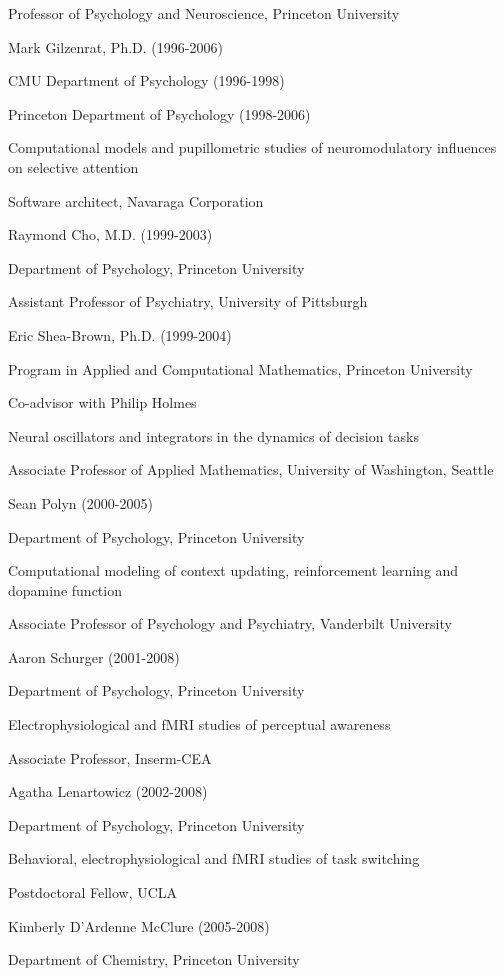 \documentclass[10 pt]{article}
\begin{document}
Professor of Psychology and Neuroscience, Princeton University
    \medskip

Mark Gilzenrat, Ph.D. (1996-2006)

CMU Department of Psychology (1996-1998)

Princeton Department of Psychology (1998-2006)

Computational models and pupillometric studies of neuromodulatory influences on selective attention

Software architect, Navaraga Corporation
    \medskip

Raymond Cho, M.D. (1999-2003)

Department of Psychology, Princeton University

Assistant Professor of Psychiatry, University of Pittsburgh
    \medskip

Eric Shea-Brown, Ph.D. (1999-2004)

Program in Applied and Computational Mathematics, Princeton University

Co-advisor with Philip Holmes

Neural oscillators and integrators in the dynamics of decision tasks

Associate Professor of Applied Mathematics, University of Washington, Seattle
    \medskip

Sean Polyn (2000-2005)

Department of Psychology, Princeton University

Computational modeling of context updating, reinforcement learning and dopamine function

Associate Professor of Psychology and Psychiatry, Vanderbilt University
    \medskip

Aaron Schurger (2001-2008)

Department of Psychology, Princeton University

Electrophysiological and fMRI studies of perceptual awareness

Associate Professor, Inserm-CEA
    \medskip

Agatha Lenartowicz (2002-2008)

Department of Psychology, Princeton University

Behavioral, electrophysiological and fMRI studies of task switching

Postdoctoral Fellow, UCLA
    \medskip

Kimberly D’Ardenne McClure (2005-2008)

Department of Chemistry, Princeton University
\end{document}
